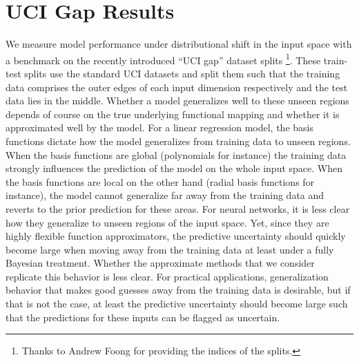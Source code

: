 \documentclass[../thesis.tex]{subfiles}
\begin{document}
\chapter{UCI Gap Results}
\label{appendix:uci-gap}
We measure model performance under distributional shift in the input space with a benchmark on the recently introduced ``UCI gap'' dataset splits \parencite{foong2019between}\footnote{Thanks to Andrew Foong for providing the indices of the splits.}. These train-test splits use the standard UCI datasets and split them such that the training data comprises the outer edges of each input dimension respectively and the test data lies in the middle. Whether a model generalizes well to these unseen regions depends of course on the true underlying functional mapping and whether it is approximated well by the model. For a linear regression model, the basis functions dictate how the model generalizes from training data to unseen regions. When the basis functions are global (polynomials for instance) the training data strongly influences the prediction of the model on the whole input space. When the basis functions are local on the other hand (radial basis functions for instance), the model cannot generalize far away from the training data and reverts to the prior prediction for these areas. For neural networks, it is less clear how they generalize to unseen regions of the input space. Yet, since they are highly flexible function approximators, the predictive uncertainty should quickly become large when moving away from the training data at least under a fully Bayesian treatment. Whether the approximate methods that we consider replicate this behavior is less clear. For practical applications, generalization behavior that makes good guesses away from the training data is desirable, but if that is not the case, at least the predictive uncertainty should become large such that the predictions for these inputs can be flagged as uncertain.
\end{document}
